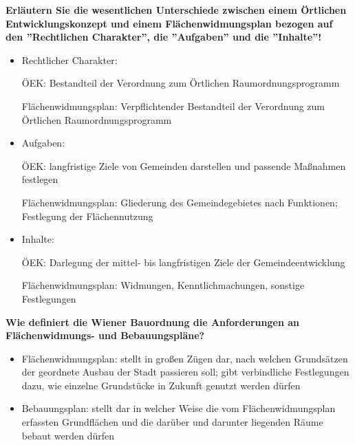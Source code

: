 \documentclass[]{article}
\newenvironment{question}{\vspace{8mm}\noindent\bfseries}{\\}
\begin{document}
\begin{question}
	Erläutern Sie die wesentlichen Unterschiede zwischen einem Örtlichen Entwicklungskonzept und einem Flächenwidmungsplan bezogen auf den ''Rechtlichen Charakter'', die ''Aufgaben'' und die ''Inhalte''!
\end{question}
\begin{itemize}
	\item Rechtlicher Charakter:
	
	ÖEK: Bestandteil der Verordnung zum Örtlichen Raumordnungsprogramm
	
	Flächenwidmungsplan: Verpflichtender Bestandteil der Verordnung zum Örtlichen Raumordnungsprogramm
	
	\item Aufgaben:
	
	ÖEK: langfristige Ziele von Gemeinden darstellen und passende Maßnahmen festlegen
	
	Flächenwidmungsplan: Gliederung des Gemeindegebietes nach Funktionen; Festlegung der Flächennutzung
	
	\item Inhalte:
	
	ÖEK: Darlegung der mittel- bis langfristigen Ziele der Gemeindeentwicklung
	
	Flächenwidmungsplan: Widmungen, Kenntlichmachungen, sonstige Festlegungen
\end{itemize}

\begin{question}
	Wie definiert die Wiener Bauordnung die Anforderungen an Flächenwidmungs- und Bebauungspläne?
\end{question}
\begin{itemize}
	\item Flächenwidmungsplan: stellt in großen Zügen dar, nach welchen Grundsätzen der geordnete Ausbau der Stadt passieren soll; gibt verbindliche Festlegungen dazu, wie einzelne Grundstücke in Zukunft genutzt werden dürfen
	
	\item Bebauungsplan: stellt dar in welcher Weise die vom Flächenwidmungsplan erfassten Grundflächen und die darüber und darunter liegenden Räume bebaut werden dürfen
\end{itemize}
\end{document}
